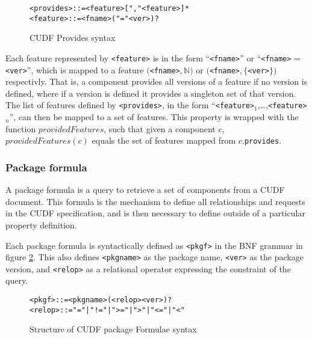 \begin{figure}[htp] 
\begin{center}
\begin{alltt}
<provides> ::= <feature> ["," <feature>]*
<feature> :: = <fname> ("=" <ver>)?
\end{alltt}
  \caption[Provides syntax]{CUDF Provides syntax}
  \label{formal.cudfprovidessyntax}
\end{center}
\end{figure}

Each feature represented by \verb+<feature>+ is in the form ``\verb+<fname>+'' or  ``\verb+<fname>+ = \verb+<ver>+'', 
which is mapped to a feature $($\verb+<fname>+$,\mathbb{N})$ or $($\verb+<fname>+$,\{$\verb+<ver>+$\})$ respectivly.
That is, a component provides all versions of a feature if no version is defined, where if a version is defined it provides a singleton set of that version. 
The list of features defined by \verb+<provides>+, in the form ``\verb+<feature>+$_1$,\ldots,\verb+<feature>+$_n$'', can then be mapped to a set of features.
This property is wrapped with the function $providedFeatures$,
such that given a component $c$, $providedFeatures(c)$ equals the set of features mapped from $c$.\verb+provides+.

\subsubsection{Package formula}
A package formula is a query to retrieve a set of components from a CUDF document.
This formula is the mechanism to define all relationships and requests in the CUDF specification,
and is then necessary to define outside of a particular property definition. 

Each package formula is syntactically defined as \verb+<pkgf>+ in the BNF grammar in figure \ref{formal.cudfpackageformulasyntax}.
This also defines \verb+<pkgname>+ as the package name, \verb+<ver>+ as the package version, and \verb+<relop>+ as a relational operator expressing the constraint of the query.

\begin{figure}[htp] 
\begin{center}
\begin{alltt}
<pkgf> ::= <pkgname> (<relop> <ver>)?
<relop> ::=  "=" | "!=" | ">=" | ">" | "<=" | "<"
\end{alltt}
  \caption[Package Formulae syntax]{Structure of CUDF package Formulae syntax}
  \label{formal.cudfpackageformulasyntax}
\end{center}
\end{figure}

